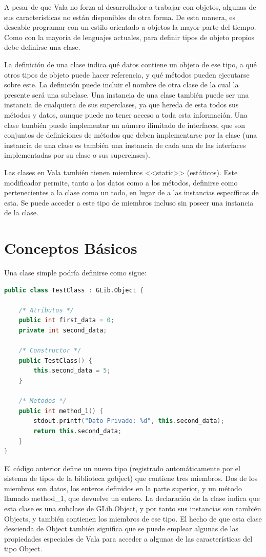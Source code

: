 \documentclass[12pt,twoside]{book}
\begin{document}
A pesar de que Vala no forza al desarrollador a trabajar con objetos, algunas de sus características no están disponibles de otra forma. De esta manera, es deseable programar con un estilo orientado a objetos la mayor parte del tiempo. Como con la mayoría de lenguajes actuales, para definir tipos de objeto propios debe definirse una clase.

La definición de una clase indica qué datos contiene un objeto de ese tipo, a qué otros tipos de objeto puede hacer referencia, y qué métodos pueden ejecutarse sobre este. La definición puede incluir el nombre de otra clase de la cual la presente será una subclase. Una instancia de una clase también puede ser una instancia de cualquiera de sus superclases, ya que hereda de esta todos sus métodos y datos, aunque puede no tener acceso a toda esta información. Una clase también puede implementar un número ilimitado de interfaces, que son conjuntos de definiciones de métodos que deben implementarse por la clase (una instancia de una clase es también una instancia de cada una de las interfaces implementadas por su clase o sus superclases).

Las clases en Vala también tienen miembros <<static>> (estáticos). Este modificador permite, tanto a los datos como a los métodos, definirse como pertenecientes a la clase como un todo, en lugar de a las instancias específicas de esta. Se puede acceder a este tipo de miembros incluso sin poseer una instancia de la clase.

\section{Conceptos Básicos}

Una clase simple podría definirse como sigue:

\begin{lstlisting}[language=C++]
public class TestClass : GLib.Object {
	
	/* Atributos */
	public int first_data = 0;
	private int second_data;
	
	/* Constructor */
	public TestClass() {
		this.second_data = 5;
	}
	
	/* Metodos */
	public int method_1() {
		stdout.printf("Dato Privado: %d", this.second_data);
		return this.second_data;
	}
}
\end{lstlisting}

El código anterior define un nuevo tipo (registrado automáticamente por el sistema de tipos de la biblioteca gobject) que contiene tres miembros. Dos de los miembros son datos, los enteros definidos en la parte superior, y un método llamado method\_1, que devuelve un entero. La declaración de la clase indica que esta clase es una subclase de GLib.Object, y por tanto sus instancias son también Objects, y también contienen los miembros de ese tipo. El hecho de que esta clase descienda de Object también significa que se puede emplear algunas de las propiedades especiales de Vala para acceder a algunas de las características del tipo Object.
\end{document}
